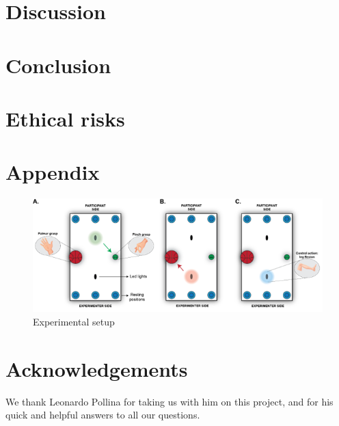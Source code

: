 \documentclass[10pt,conference,compsocconf]{IEEEtran}
\begin{document}
\section{Discussion}
\label{sec:discussion}

\section{Conclusion}
\label{sec:conclusion}


\section{Ethical risks}




\section{Appendix}

\begin{figure}[h!]
    \center
    \includegraphics[width=\linewidth]{images/2024-12-11-13-41-23.png}
    \caption{Experimental setup}
\end{figure}
\FloatBarrier




\section*{Acknowledgements}
We thank Leonardo Pollina for taking us with him on this project, and for his quick and helpful answers to all our questions.



\end{document}
